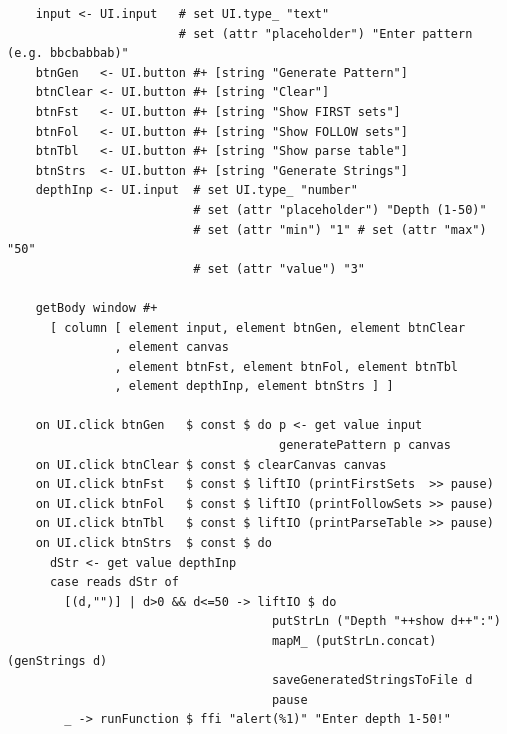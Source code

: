 \documentclass[areasetadvanced]{scrartcl}
\begin{document}
\begin{lstlisting}
    input <- UI.input   # set UI.type_ "text"
                        # set (attr "placeholder") "Enter pattern (e.g. bbcbabbab)"
    btnGen   <- UI.button #+ [string "Generate Pattern"]
    btnClear <- UI.button #+ [string "Clear"]
    btnFst   <- UI.button #+ [string "Show FIRST sets"]
    btnFol   <- UI.button #+ [string "Show FOLLOW sets"]
    btnTbl   <- UI.button #+ [string "Show parse table"]
    btnStrs  <- UI.button #+ [string "Generate Strings"]
    depthInp <- UI.input  # set UI.type_ "number"
                          # set (attr "placeholder") "Depth (1-50)"
                          # set (attr "min") "1" # set (attr "max") "50"
                          # set (attr "value") "3"
  
    getBody window #+
      [ column [ element input, element btnGen, element btnClear
               , element canvas
               , element btnFst, element btnFol, element btnTbl
               , element depthInp, element btnStrs ] ]
  
    on UI.click btnGen   $ const $ do p <- get value input
                                      generatePattern p canvas
    on UI.click btnClear $ const $ clearCanvas canvas
    on UI.click btnFst   $ const $ liftIO (printFirstSets  >> pause)
    on UI.click btnFol   $ const $ liftIO (printFollowSets >> pause)
    on UI.click btnTbl   $ const $ liftIO (printParseTable >> pause)
    on UI.click btnStrs  $ const $ do
      dStr <- get value depthInp
      case reads dStr of
        [(d,"")] | d>0 && d<=50 -> liftIO $ do
                                     putStrLn ("Depth "++show d++":")
                                     mapM_ (putStrLn.concat) (genStrings d)
                                     saveGeneratedStringsToFile d
                                     pause
        _ -> runFunction $ ffi "alert(%1)" "Enter depth 1-50!"
\end{lstlisting}
\end{document}
